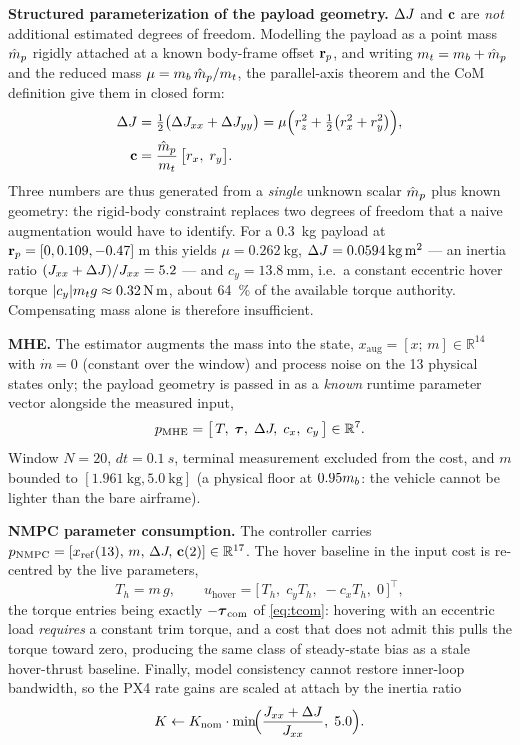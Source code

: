 \textbf{Structured parameterization of the payload geometry.} $\Delta J$ and $\mathbf{c}$ are
\emph{not} additional estimated degrees of freedom. Modelling the payload as a point mass
$\hat{m}_p$ rigidly attached at a known body-frame offset $\mathbf{r}_p$, and writing
$m_t = m_b + \hat{m}_p$ and the reduced mass $\mu = m_b\,\hat{m}_p / m_t$, the parallel-axis theorem and
the CoM definition give them in closed form:
\begin{align}
\Delta J &= \tfrac12\bigl(\Delta J_{xx} + \Delta J_{yy}\bigr) = \mu\Bigl( r_z^2 + \tfrac12\bigl(r_x^2 + r_y^2\bigr) \Bigr), \label{eq:dj}\\
\mathbf{c} &= \frac{\hat{m}_p}{m_t}\,\bigl[r_x,\; r_y\bigr]. \label{eq:cxy}
\end{align}
Three numbers are thus generated from a \emph{single} unknown scalar $\hat{m}_p$ plus known
geometry: the rigid-body constraint replaces two degrees of freedom that a naive
augmentation would have to identify. For a \SI{0.3}{\kg} payload at
$\mathbf{r}_p = [0, 0.109, -0.47]\,$\si{\meter} this yields $\mu = \SI{0.262}{\kg}$,
$\dJ = \SI{0.0594}{\kg\meter\squared}$ --- an inertia ratio $(J_{xx}+\Delta J)/J_{xx} = 5.2$ ---
and $c_y = \SI{13.8}{\milli\meter}$, i.e.\ a constant eccentric hover torque
$|c_y| m_t g \approx \SI{0.32}{\newton\meter}$, about \SI{64}{\percent} of the available
torque authority. Compensating mass alone is therefore insufficient.

\textbf{MHE.} The estimator augments the mass into the state,
$x_{\mathrm{aug}} = [x;\, m] \in \mathbb{R}^{14}$ with $\dot m = 0$ (constant over the window)
and process noise on the 13 physical states only; the payload geometry is passed in as a
\emph{known} runtime parameter vector alongside the measured input,
\begin{equation}
p_{\mathrm{MHE}} = \bigl[\, T,\; \boldsymbol{\tau},\; \Delta J,\; c_x,\; c_y \,\bigr] \in \mathbb{R}^{7}. \label{eq:pmhe}
\end{equation}
Window $N = 20$, $dt = \SI{0.1}{s}$, terminal measurement excluded from the cost, and $m$
bounded to $[\SI{1.961}{\kg}, \SI{5.0}{\kg}]$ (a physical floor at $0.95m_b$: the vehicle
cannot be lighter than the bare airframe).

\textbf{NMPC parameter consumption.} The controller carries
$p_{\mathrm{NMPC}} = [x_{\mathrm{ref}}(13),\, m,\, \Delta J,\, \mathbf{c}(2)] \in \mathbb{R}^{17}$.
The hover baseline in the input cost is re-centred by the live parameters,
\begin{equation}
T_h = m\,g, \qquad
u_{\mathrm{hover}} = \bigl[\, T_h,\; c_y T_h,\; -c_x T_h,\; 0 \,\bigr]^{\!\top}, \label{eq:hover}
\end{equation}
the torque entries being exactly $-\boldsymbol{\tau}_{\mathrm{com}}$ of \eqref{eq:tcom}: hovering with an eccentric load
\emph{requires} a constant trim torque, and a cost that does not admit this pulls the torque
toward zero, producing the same class of steady-state bias as a stale hover-thrust baseline.
Finally, model consistency cannot restore inner-loop bandwidth, so the PX4 rate gains are
scaled at attach by the inertia ratio
\begin{equation}
K \leftarrow K_{\mathrm{nom}} \cdot \min\!\Bigl( \frac{J_{xx} + \Delta J}{J_{xx}},\; 5.0 \Bigr). \label{eq:gain}
\end{equation}

